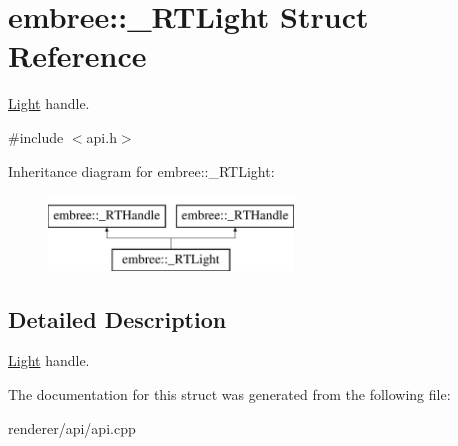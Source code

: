 \hypertarget{structembree_1_1___r_t_light}{
\section{embree::\_\-RTLight Struct Reference}
\label{structembree_1_1___r_t_light}
}


\hyperlink{classembree_1_1_light}{Light} handle.  




{\ttfamily \#include $<$api.h$>$}

Inheritance diagram for embree::\_\-RTLight:\begin{figure}[H]
\begin{center}
\leavevmode
\includegraphics[height=2.000000cm]{structembree_1_1___r_t_light}
\end{center}
\end{figure}


\subsection{Detailed Description}
\hyperlink{classembree_1_1_light}{Light} handle. 

The documentation for this struct was generated from the following file:\begin{DoxyCompactItemize}
\item 
renderer/api/api.cpp\end{DoxyCompactItemize}
